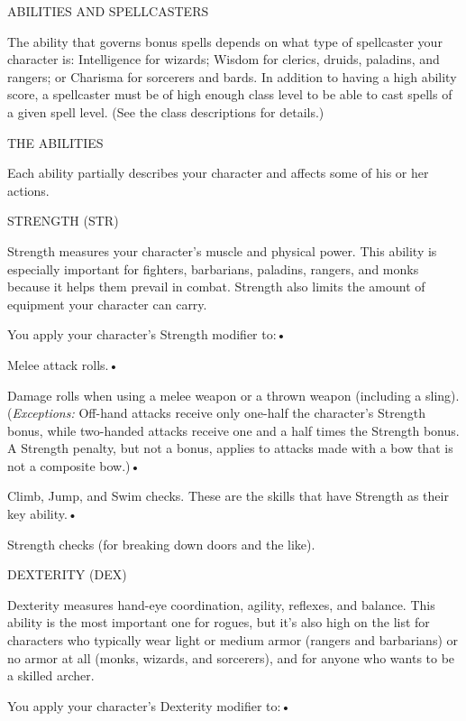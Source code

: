 \vspace{12pt}
ABILITIES AND SPELLCASTERS

The ability that governs bonus spells depends on what type of spellcaster your 
character is: Intelligence for wizards; Wisdom for clerics, druids, paladins, and 
rangers; or Charisma for sorcerers and bards. In addition to having a high ability 
score, a spellcaster must be of high enough class level to be able to cast spells 
of a given spell level. (See the class descriptions for details.)

\vspace{12pt}
{\LARGE{}THE ABILITIES}

Each ability partially describes your character and affects some of his or her 
actions.

\vspace{12pt}
STRENGTH (STR)

Strength measures your character's muscle and physical power. This ability is especially 
important for fighters, barbarians, paladins, rangers, and monks because it helps 
them prevail in combat. Strength also limits the amount of equipment your character 
can carry.

You apply your character's Strength modifier to:• 

\parindent=3pt
Melee attack rolls.• 

Damage rolls when using a melee weapon or a thrown weapon (including a sling). 
(\textit{Exceptions: }Off-hand attacks receive only one-half the character's Strength 
bonus, while two-handed attacks receive one and a half times the Strength bonus. 
A Strength penalty, but not a bonus, applies to attacks made with a bow that is 
not a composite bow.)• 

Climb, Jump, and Swim checks. These are the skills that have Strength as their 
key ability.• 

\parindent=7pt
Strength checks (for breaking down doors and the like).

\vspace{12pt}
\parindent=0pt
DEXTERITY (DEX)

Dexterity measures hand-eye coordination, agility, reflexes, and balance. This 
ability is the most important one for rogues, but it's also high on the list for 
characters who typically wear light or medium armor (rangers and barbarians) or 
no armor at all (monks, wizards, and sorcerers), and for anyone who wants to be 
a skilled archer.

You apply your character's Dexterity modifier to:• 

